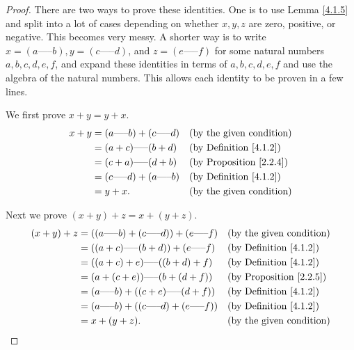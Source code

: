 \begin{proof}
    There are two ways to prove these identities.
    One is to use Lemma \ref{4.1.5} and split into a lot of cases depending on whether \(x, y, z\) are zero, positive, or negative.
    This becomes very messy.
    A shorter way is to write \(x = (a \text{-----} b), y = (c \text{-----} d)\), and \(z = (e \text{-----} f)\) for some natural numbers \(a, b, c, d, e, f\), and expand these identities in terms of \(a, b, c, d, e, f\) and use the algebra of the natural numbers.
    This allows each identity to be proven in a few lines.

    We first prove \(x + y = y + x\).
    \begin{align*}
        x + y & = (a \text{-----} b) + (c \text{-----} d) &  & \text{(by the given condition)}     \\
              & = (a + c) \text{-----} (b + d)            &  & \text{(by Definition \ref{4.1.2})}  \\
              & = (c + a) \text{-----} (d + b)            &  & \text{(by Proposition \ref{2.2.4})} \\
              & = (c \text{-----} d) + (a \text{-----} b) &  & \text{(by Definition \ref{4.1.2})}  \\
              & = y + x.                                  &  & \text{(by the given condition)}
    \end{align*}

    Next we prove \((x + y) + z = x + (y + z)\).
    \begin{align*}
        (x + y) + z & = ((a \text{-----} b) + (c \text{-----} d)) + (e \text{-----} f) &  & \text{(by the given condition)}     \\
                    & = ((a + c) \text{-----} (b + d)) + (e \text{-----} f)            &  & \text{(by Definition \ref{4.1.2})}  \\
                    & = ((a + c) + e) \text{-----} ((b + d) + f)                       &  & \text{(by Definition \ref{4.1.2})}  \\
                    & = (a + (c + e)) \text{-----} (b + (d + f))                       &  & \text{(by Proposition \ref{2.2.5})} \\
                    & = (a \text{-----} b) + ((c + e) \text{-----} (d + f))            &  & \text{(by Definition \ref{4.1.2})}  \\
                    & = (a \text{-----} b) + ((c \text{-----} d) + (e \text{-----} f)) &  & \text{(by Definition \ref{4.1.2})}  \\
                    & = x + (y + z).                                                   &  & \text{(by the given condition)}
    \end{align*}


\end{proof}
